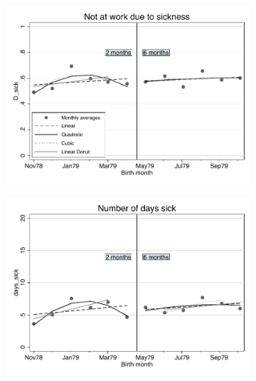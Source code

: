 \documentclass[a4paper ]{article}
\begin{document}
\newpage
\begin{figure}[p]
\begin{subfigure}[h]{0.48\textwidth}\centering
	\includegraphics[width=\textwidth]{../../analysis/graphs/SOEP/D_sick_RD.pdf}
\end{subfigure}
\quad
\begin{subfigure}[h]{0.48\textwidth}\centering
	\includegraphics[width=\textwidth]{../../analysis/graphs/SOEP/Days_sick_RD.pdf}
\end{subfigure}


\end{figure}
\end{document}
